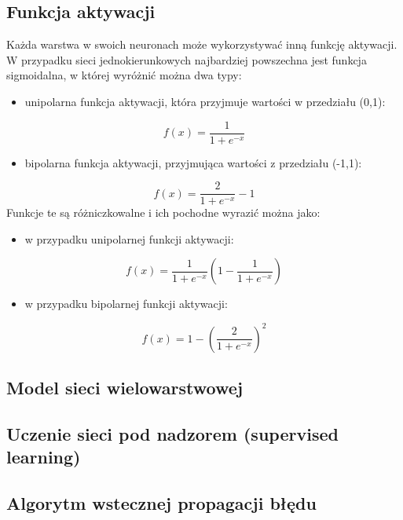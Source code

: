 \documentclass[12pt,twoside]{article}
\begin{document}
\subsection{Funkcja aktywacji}
Każda warstwa w swoich neuronach może wykorzystywać inną funkcję aktywacji.
W przypadku sieci jednokierunkowych najbardziej powszechna jest funkcja sigmoidalna, w której wyróżnić można dwa typy:
\begin{itemize}
	\item unipolarna funkcja aktywacji, która przyjmuje wartości w przedziału (0,1):
\end{itemize}
\begin{equation}
	f(x) = \frac{1}{1+e^{-x}}
	\label{Eq:unipolar_sigmoid}
\end{equation}
\begin{itemize}[resume]
	\item bipolarna funkcja aktywacji, przyjmująca wartości z przedziału (-1,1):
\end{itemize}
\begin{equation}
	f(x) = \frac{2}{1+e^{-x}} - 1
	\label{Eq:bipolar_sigmoid}
\end{equation}
Funkcje te są różniczkowalne i ich pochodne wyrazić można jako:
\begin{itemize}
	\item w przypadku unipolarnej funkcji aktywacji:
\end{itemize}
\begin{equation}
	f(x) = \frac{1}{1+e^{-x}}(1-\frac{1}{1+e^{-x}})
	\label{Eq:unipolar_sigmoid_pochodna}
\end{equation}
\begin{itemize}[resume]
	\item w przypadku bipolarnej funkcji aktywacji:
\end{itemize}
\begin{equation}
	f(x) = 1 - (\frac{2}{1+e^{-x}})^2
	\label{Eq:bipolar_sigmoid_pochodna}
\end{equation}
\newpage
\subsection{Model sieci wielowarstwowej}
\subsection{Uczenie sieci pod nadzorem (supervised learning)}
\subsection{Algorytm wstecznej propagacji błędu}
\end{document}
